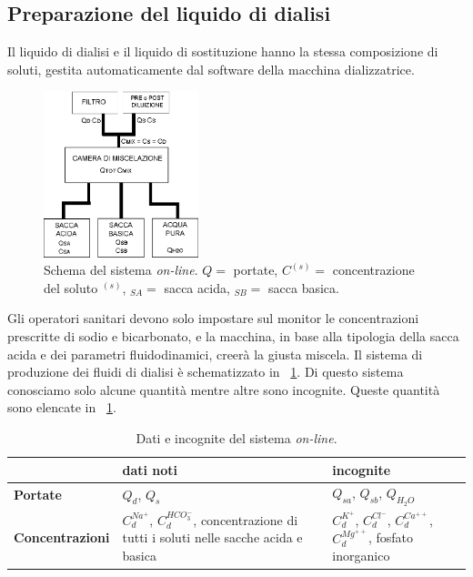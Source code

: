 \subsection{Preparazione del liquido di dialisi}
Il liquido di dialisi e il liquido di sostituzione hanno la stessa composizione di soluti, gestita automaticamente dal software della macchina dializzatrice.
\begin{figure}[htb]
	\centering
		\includegraphics[width=0.4\textwidth]{immagini/on_line_def.eps}
		\caption{Schema del sistema \textit{on-line}. $Q=$ portate, $C^{(s)}=$ concentrazione del soluto $^{(s)}$, $_{SA}=$ sacca acida, $_{SB}=$ sacca basica.}
		\label{online}
\end{figure}
Gli operatori sanitari devono solo impostare sul monitor le concentrazioni prescritte di sodio e bicarbonato, e la macchina, in base alla tipologia della sacca acida e dei parametri fluidodinamici, creerà la giusta miscela. Il sistema di produzione dei fluidi di dialisi è schematizzato in \figurename~\ref{online}. Di questo sistema conosciamo solo alcune quantità mentre altre sono incognite. Queste quantità sono elencate in \tablename~\ref{tab:inc}.
\begin{table}[htb]
\centering
\caption{Dati e incognite del sistema \textit{on-line}.}\label{tab:inc}
\begin{tabularx}{\columnwidth}{lXX}
\toprule
                 & \textbf{dati noti} & \textbf{incognite} \\
\midrule
\textbf{Portate} & $Q_d$, $Q_s$       &     $Q_{sa}$, $Q_{sb}$, $Q_{H_2O}$ \\
\midrule
\textbf{Concentrazioni} &   $C_d^{Na^+}$, $C_d^{HCO_3^-}$, \newline concentrazione di tutti i soluti nelle sacche acida e basica & $C_d^{K^+}$, $C_d^{Cl^-}$, $C_d^{Ca^{++}}$, $C_d^{Mg^{++}}$, \newline fosfato inorganico \\
\bottomrule
\end{tabularx}
\end{table}
